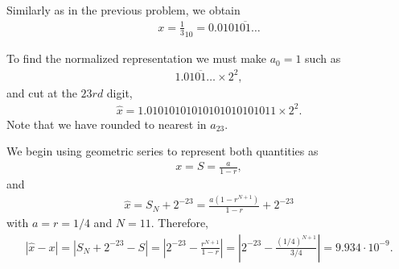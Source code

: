 \begin{questions}

\begin{solution}
Similarly as in the previous problem, we obtain
\begin{align*}
x=\frac{1}{3}_{10}=0.0101\overline{01}\dots
\end{align*}
\end{solution}
\begin{solution}
To find the normalized representation we must make $a_0=1$ such as
\begin{align*}
1.01\overline{01}\dots\times 2^2,
\end{align*}
and cut at the $23rd$ digit,
\begin{align*}
\hat{x}=1.01010101010101010101011\times 2^2.
\end{align*}
Note that we have rounded to nearest in $a_{23}$.
\end{solution}
\begin{solution}
We begin using geometric series to represent both quantities as
\begin{align*}
x=S=\frac{a}{1-r},
\end{align*}
and
\begin{align*}
\hat{x}=S_N+2^{-23}=\frac{a(1-r^{N+1})}{1-r}+2^{-23}
\end{align*}
with $a=r=1/4$ and $N=11$. Therefore,
\begin{align*}
|\hat{x}-x|=|S_N+2^{-23}-S|=\left|2^{-23}-\frac{r^{N+1}}{1-r}\right|=\left|2^{-23}-\frac{(1/4)^{N+1}}{3/4}\right|=9.934\cdot 10^{-9}.
\end{align*}
\end{solution}
\end{questions}
